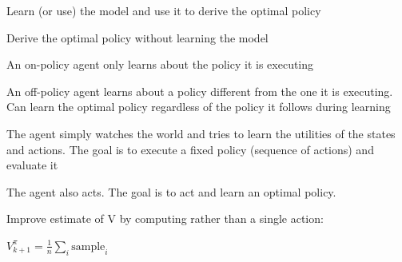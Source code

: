 \documentclass[
../../EiKI_Summary.tex,
]
{subfiles}
\begin{document}
\begin{minipage}
    [t]{0.5\textwidth}
    \begin{defbox}
        Learn (or use) the model and use it to derive the optimal policy
    \end{defbox}
\end{minipage}
\begin{minipage}
    [t]{0.5\textwidth}
    \begin{defbox}
        Derive the optimal policy without learning the model
    \end{defbox}
\end{minipage}

\begin{minipage}
    [t]{0.5\textwidth}
    \begin{defbox}
        [On-Policy]
        An on-policy agent only learns about the policy it is executing
    \end{defbox}
\end{minipage}
\begin{minipage}
    [t]{0.5\textwidth}
    \begin{defbox}
        An off-policy agent learns about a policy different from the one it is executing. Can learn the optimal policy regardless of the policy it follows during learning
    \end{defbox}
\end{minipage}

\begin{minipage}
    [t]{0.5\textwidth}
    \begin{defbox}
        The agent simply watches the world and tries to learn the utilities of the states and actions. The goal is to execute a fixed policy (sequence of actions) and evaluate it
    \end{defbox}
\end{minipage}
\begin{minipage}
    [t]{0.5\textwidth}
    \begin{defbox}
        The agent also acts. The goal is to act and learn an optimal policy.
    \end{defbox}
\end{minipage}

\begin{defbox}
    Improve estimate of V by computing rather than a single action:

    \begin{csmb*}
        $V_{k+1}^\pi = \frac{1}{n} \sum_{i} \text{sample}_i$
    \end{csmb*}
\end{defbox}
\end{document}
